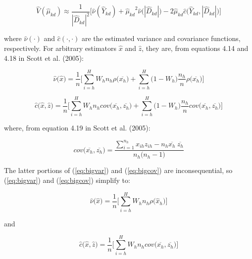 \documentclass[12pt]{article}
\begin{document}
 \begin{equation}
\hat{V}(\hat{\mu}_{kd}) \approx \frac{1}{{|\hat{D}_{kd}|}^2} \Big[ \hat{\nu}(\hat{Y}_{kd}) + {\hat{\mu}_{kd}}^2 \hat{\nu} \big( |\hat{D}_{kd}| \big) - 
2\hat{\mu}_{kd}\hat{c}\big(\hat{Y}_{kd},  |\hat{D}_{kd}| \big) \Big]
\end{equation}

where $\hat{\nu}(\cdot)$ and $\hat{c}(\cdot, \cdot)$ are the estimated variance and covariance functions, respectively.  For arbitrary estimators $\hat{x}$ and $\hat{z}$, they are, from equations 4.14 and 4.18 in Scott et al. (2005):

 \begin{equation} \label{eq:bigvar}
\hat{\nu}\big( \hat{x} \big) = \frac{1}{n} \Big[ \displaystyle\sum_{i=h}^{H} W_h n_h\rho\big(\overline{x_{h}}\big) +  
\displaystyle\sum_{i=h}^{H} \big(1 - W_h) \frac{ n_h}{n}\rho\big(\overline{x_h}\big)    \Big]
\end{equation}

 \begin{equation} \label{eq:bigcov}
\hat{c}\big(\hat{x}, \hat{z}\big) = \frac{1}{n} \Big[ \displaystyle\sum_{i=h}^{H} W_h n_h cov\big(\overline{x_h}, \overline{z_h}\big) +  
\displaystyle\sum_{i=h}^{H} \big(1 - W_h) \frac{ n_h}{n}cov\big(\overline{x_h}, \overline{z_h}\big)    \Big]
\end{equation}

where, from equation 4.19 in Scott et al. (2005):

\begin{equation}
cov\big(\overline{x_h}, \overline{z_h}\big) = \frac{\displaystyle\sum_{i=1}^{n_h}x_{ih}z_{ih}-n_h\overline{x_h} ~ \overline{z_{h}}}{n_h\big(n_h-1\big)}
\end{equation}

The latter portions of (\ref{eq:bigvar}) and (\ref{eq:bigcov}) are inconsequential, so (\ref{eq:bigvar}) and (\ref{eq:bigcov}) simplify to: 

 \begin{equation} \label{eq:bigvar_trunc}
\hat{\nu}\big( \hat{x} \big) = \frac{1}{n} \Big[ \displaystyle\sum_{i=h}^{H} W_h n_h\rho\big(\hat{x}_{h}\big)   \Big]
\end{equation}

and

 \begin{equation} \label{eq:bigcov_trunc}
\hat{c}\big(\hat{x}, \hat{z}\big) = \frac{1}{n} \Big[ \displaystyle\sum_{i=h}^{H} W_h n_h cov\big(\overline{x_h}, \overline{z_h}\big)    \Big] 
\end{equation}
\end{document}
